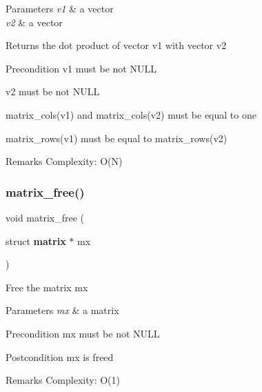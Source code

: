 \begin{DoxyParams}{Parameters}
{\em v1} & a vector \\
\hline
{\em v2} & a vector \\
\hline
\end{DoxyParams}
\begin{DoxyReturn}{Returns}
the dot product of vector {\ttfamily v1} with vector {\ttfamily v2}
\end{DoxyReturn}
\begin{DoxyPrecond}{Precondition}
{\ttfamily v1} must be not N\+U\+LL 

{\ttfamily v2} must be not N\+U\+LL 

{\ttfamily matrix\+\_\+cols(v1)} and {\ttfamily matrix\+\_\+cols(v2)} must be equal to one 

{\ttfamily matrix\+\_\+rows(v1)} must be equal to {\ttfamily matrix\+\_\+rows(v2)}
\end{DoxyPrecond}
\begin{DoxyRemark}{Remarks}
Complexity\+: O(\+N) 
\end{DoxyRemark}
\mbox{\label{matrix_8c_ac19cd61ef9f183a9b92d6789399f8646}} 
\subsubsection{matrix\+\_\+free()}
{\footnotesize\ttfamily void matrix\+\_\+free (\begin{DoxyParamCaption}\item[{struct \textbf{ matrix} $\ast$}]{mx }\end{DoxyParamCaption})\hspace{0.3cm}{\ttfamily [inline]}}

Free the matrix {\ttfamily mx}


\begin{DoxyParams}{Parameters}
{\em mx} & a matrix\\
\hline
\end{DoxyParams}
\begin{DoxyPrecond}{Precondition}
{\ttfamily mx} must be not N\+U\+LL
\end{DoxyPrecond}
\begin{DoxyPostcond}{Postcondition}
{\ttfamily mx} is freed
\end{DoxyPostcond}
\begin{DoxyRemark}{Remarks}
Complexity\+: O(1) 
\end{DoxyRemark}
\mbox{\label{matrix_8c_a52deb76b55ddbb957264866f5c856d0a}} 

